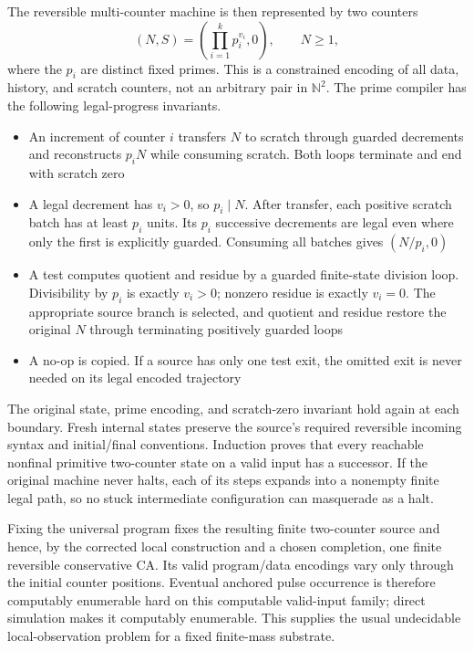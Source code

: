 \documentclass[11pt,letterpaper]{article}
\numberwithin{equation}{section}
\theoremstyle{definition}
\theoremstyle{remark}
\newcommand{\NN}{\mathbb N}
\begin{document}
The reversible multi-counter machine is then represented by two counters
\begin{equation}\label{smc:sl:eq:prime}
 (N,S)=\left(\prod_{i=1}^k p_i^{v_i},0\right),
 \qquad N\ge1,
\end{equation}
where the $p_i$ are distinct fixed primes. This is a constrained encoding of all data, history, and scratch counters, not an arbitrary pair in $\NN^2$. The prime compiler has the following legal-progress invariants.
\begin{itemize}
\item An increment of counter $i$ transfers $N$ to scratch through guarded decrements and reconstructs $p_iN$ while consuming scratch. Both loops terminate and end with scratch zero
\item A legal decrement has $v_i>0$, so $p_i\mid N$. After transfer, each positive scratch batch has at least $p_i$ units. Its $p_i$ successive decrements are legal even where only the first is explicitly guarded. Consuming all batches gives $(N/p_i,0)$
\item A test computes quotient and residue by a guarded finite-state division loop. Divisibility by $p_i$ is exactly $v_i>0$; nonzero residue is exactly $v_i=0$. The appropriate source branch is selected, and quotient and residue restore the original $N$ through terminating positively guarded loops
\item A no-op is copied. If a source has only one test exit, the omitted exit is never needed on its legal encoded trajectory
\end{itemize}
The original state, prime encoding, and scratch-zero invariant hold again at each boundary. Fresh internal states preserve the source's required reversible incoming syntax and initial/final conventions. Induction proves that every reachable nonfinal primitive two-counter state on a valid input has a successor. If the original machine never halts, each of its steps expands into a nonempty finite legal path, so no stuck intermediate configuration can masquerade as a halt.

Fixing the universal program fixes the resulting finite two-counter source and hence, by the corrected local construction and a chosen completion, one finite reversible conservative CA. Its valid program/data encodings vary only through the initial counter positions. Eventual anchored pulse occurrence is therefore computably enumerable hard on this computable valid-input family; direct simulation makes it computably enumerable. This supplies the usual undecidable local-observation problem for a fixed finite-mass substrate.
\end{document}
